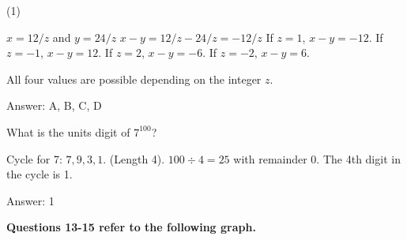 \documentclass[11pt,paper=a4,answers]{exam}
\begin{document}
\begin{questions}
\begin{tasks}(1)
\end{tasks}

\begin{solution}
\begin{center}
$x = 12/z$ and $y = 24/z$
\vspace{5pt}
$x - y = 12/z - 24/z = -12/z$
\vspace{5pt}
If $z=1$, $x-y = -12$.
\vspace{5pt}
If $z=-1$, $x-y = 12$.
\vspace{5pt}
If $z=2$, $x-y = -6$.
\vspace{5pt}
If $z=-2$, $x-y = 6$.
\end{center}
All four values are possible depending on the integer $z$.

Answer: \colorbox{yellow!100}{A, B, C, D}
\end{solution}

\vspace{1cm}


\question
What is the units digit of $7^{100}$?

\begin{solution}
\begin{center}
Cycle for 7: $7, 9, 3, 1$. (Length 4).
\vspace{5pt}
$100 \div 4 = 25$ with remainder 0.
\vspace{5pt}
The 4th digit in the cycle is 1.
\end{center}

Answer: \colorbox{yellow!100}{1}
\end{solution}

\vspace{1cm}

\textbf{Questions 13-15 refer to the following graph.}

\begin{center}
\end{center}


\end{questions}
\end{document}

